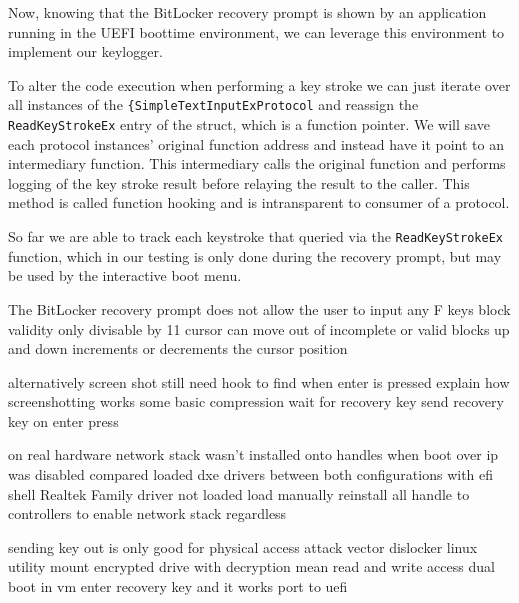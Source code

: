 Now, knowing that the BitLocker recovery prompt is shown by an application running in the UEFI boottime environment, we can leverage this environment to implement our keylogger.

To alter the code execution when performing a key stroke we can just iterate over all instances of the \lstinline{{SimpleTextInputExProtocol} and reassign the \lstinline{ReadKeyStrokeEx} entry of the struct, which is a function pointer. We will save each protocol instances' original function address and instead have it point to an intermediary function. This intermediary calls the original function and performs logging of the key stroke result before relaying the result to the caller. This method is called function hooking and is intransparent to consumer of a protocol.



So far we are able to track each keystroke that queried via the \lstinline{ReadKeyStrokeEx} function, which in our testing is only done during the recovery prompt, but may be used by the interactive boot menu.

The BitLocker recovery prompt does not allow the user to input any
F keys
block validity
only divisable by 11
cursor can move out of incomplete or valid blocks
up and down increments or decrements the cursor position

alternatively screen shot
still need hook to find when enter is pressed
explain how screenshotting works
some basic compression
wait for recovery key
send recovery key on enter press

on real hardware
network stack wasn't installed onto handles when boot over ip was disabled
compared loaded dxe drivers between both configurations with efi shell
Realtek Family driver not loaded
load manually
reinstall all handle to controllers to enable network stack regardless

sending key out is only good for physical access attack vector
dislocker linux utility
\cite{dislocker}
mount encrypted drive with decryption mean
read and write access
dual boot in vm
enter recovery key and it works
port to uefi


